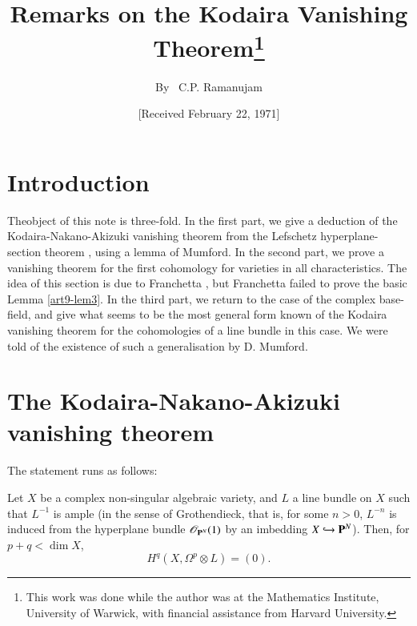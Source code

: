 \title{Remarks on the Kodaira Vanishing Theorem\footnote{This work was
done while the author was at the Mathematics Institute, University of
Warwick, with financial assistance from Harvard
University.}}\label{art9} 

\author{By~ C.P. Ramanujam}

\date{[Received February 22, 1971]}
\maketitle

\setcounter{page}{123}

\section{Introduction}\label{art9-sec1}
\setcounter{pageoriginal}{94}
The\pageoriginale object of this note is three-fold. In the first
part, we give a deduction of the Kodaira-Nakano-Akizuki vanishing
theorem \cite{art9-key1} from the Lefschetz hyperplane-section
theorem \cite{art9-key6}, using a lemma of Mumford. In the second
part, we prove a vanishing theorem for the first cohomology for
varieties in all characteristics. The idea of this section is due to
Franchetta \cite{art9-key2}, but Franchetta failed to prove the basic
Lemma \ref{art9-lem3}. In the third part, we return to the case of the complex
base-field, and give what seems to be the most general form known of
the Kodaira vanishing theorem for the cohomologies of a line bundle in
this case. We were told of the existence of such a generalisation by
D. Mumford. 

\section{The Kodaira-Nakano-Akizuki vanishing theorem}\label{art9-sec2}
The statement runs as follows:

\begin{theorem}\label{art9-thm1}%
Let $X$ be a complex non-singular algebraic variety, and $L$ a line
bundle on $X$ such that $L^{-1}$ is ample (in the sense of
Grothendieck, that is, for some $n>0$, $L^{-n}$ is induced from the
hyperplane bundle $\mathscr{O}_{\mathbf{P}^N}(1)$ by an imbedding
$X \hookrightarrow \mathbf{P}^N$). Then, for $p+q<\dim X$, 
$$ 
H^q (X,\Omega^p \otimes L) = (0).
$$
\end{theorem}

